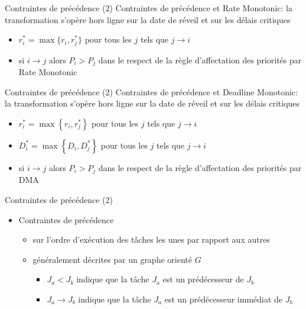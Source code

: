 \begin{frame}{Contraintes de précédence (2)} 
  Contraintes  de  précédence  et  Rate Monotonic:  la  transformation
  s'opère hors ligne sur la date de réveil et sur les délais critiques
  \begin{itemize} 
  \item $r^*_i = \max\{r_i, r^*_j\}$ pour tous les $j$ tels que $j →
    i$
  \item si $i  → j$ alors $P_i > P_j$ dans  le respect de la
    règle d'affectation des priorités par Rate Monotonic
  \end{itemize}
\end{frame} 

\begin{frame}{Contraintes de précédence (2)} 
  Contraintes de  précédence et Deadline  Monotonic: la transformation
  s'opère hors ligne sur la date de réveil et sur les délais critiques
  \begin{itemize}
  \item $r^*_i =  \max \left\{ r_i, r^*_j \right\}$  pour tous les $j$
    tels que $j → i$
  \item $D^*_i =  \max \left\{ D_i, D^*_j \right\}$  pour tous les $j$
    tels que $j → i$
  \item  si $i  →  j$  alors $P_i  >  P_j$ dans  le
    respect de la règle d'affectation des priorités par DMA
  \end{itemize} 
\end{frame} 

\begin{frame}{Contraintes de précédence (2)} 
  \begin{itemize}
  \item Contraintes de précédence 
    \begin{itemize}
    \item sur l'ordre d'exécution des  tâches les unes par rapport aux
      autres
    \item généralement décrites par un graphe orienté $G$
      \begin{itemize}
      \item $J_a < J_b$ indique que la tâche $J_a$ est un prédécesseur
        de $J_b$
      \item $J_a → J_b$ indique que la tâche $J_a$ est un prédécesseur
        immédiat de $J_b$
      \end{itemize}
    \end{itemize}
  \end{itemize}
\end{frame}

